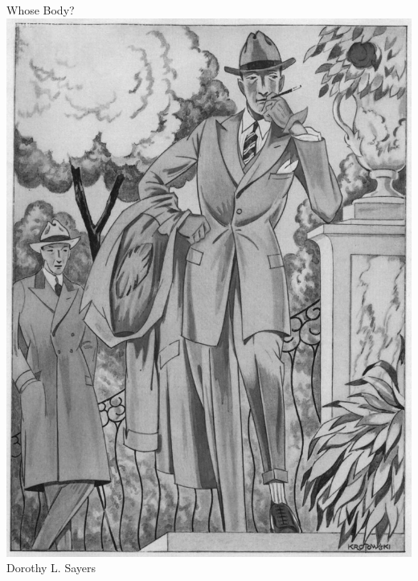 \documentclass[
a5paper,
BCOR=7mm,
twoside,
DIV=calc,
11pt,
usegeometry,
chapterprefix,
headings=big]{scrbook} %
\newcommand{\reasonablyhuge}{\fontsize{50}{60}\selectfont}
\def\coverimagesize{.6\linewidth}
\newcommand{\HUGE}{\fontsize{90}{90}\selectfont}
\def\coverimagesize{.7\linewidth}
\newcommand{\HUGE}{\fontsize{90}{90}\selectfont}
\begin{document}
\setlength{\epigraphwidth}{0.8\textwidth}
\renewcommand{\epigraphflush}{center}
\renewcommand{\sourceflush}{center}
\renewcommand*{\chaptermarkformat}{}
\renewcommand*{\chapterheadendvskip}{\vspace{10pt}}
\renewcommand*{\chapterheadstartvskip}{\vspace{0pt}}

\frontmatter
\pagestyle{empty}
\begin{titlepage}

   \recalctypearea

  \begin{center}\mytitlefont
{\HUGE Whose Body?}\\
\vspace{0.2cm}
\includegraphics[width=\coverimagesize]{pensiveguy}\\
\vspace{0.5cm}
\mytitlefont
{\reasonablyhuge Dorothy L. Sayers}\\
\end{center}


\end{titlepage}
\end{document}
